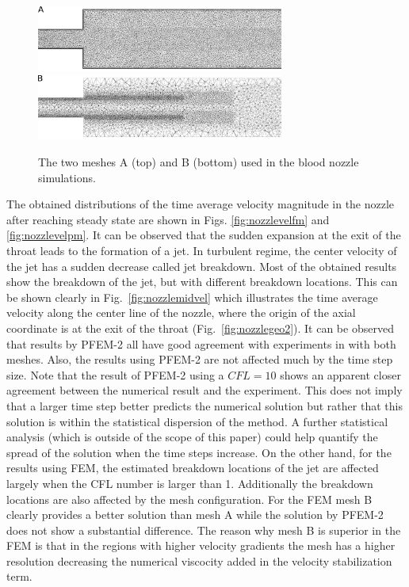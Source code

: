 \begin{figure}[htbp]
    \centering
    \includegraphics[width=3.2in]{imgs/nozzle_pump/nozzle_fmesh_2.pdf}
    \includegraphics[width=3.2in]{imgs/nozzle_pump/nozzle_pmesh_2.pdf}
    \caption{The two meshes A (top) and B (bottom) used in the blood nozzle simulations.}
    \label{fig:nozzlemesh}
\end{figure}


The obtained distributions of the time average velocity magnitude in the nozzle after reaching steady state are shown in Figs. \ref{fig:nozzlevelfm} and \ref{fig:nozzlevelpm}. It can be observed that the sudden expansion at the exit of the throat leads to the formation of a jet. In turbulent regime, the center velocity of the jet has a sudden decrease called jet breakdown. Most of the obtained results show the breakdown of the jet, but with different breakdown locations. This can be shown clearly in Fig.~\ref{fig:nozzlemidvel} which illustrates the time average velocity along the center line of the nozzle, where the origin of the axial coordinate is at the exit of the throat (Fig.~\ref{fig:nozzlegeo2}). It can be observed that results by PFEM-2 all have good agreement with experiments in \cite{hariharan_nozzle} with both meshes. Also, the results using PFEM-2 are not affected much by the time step size. Note that the result of PFEM-2 using a $CFL=10$ shows an apparent closer agreement between the numerical result and the experiment. This does not imply that a larger time step better predicts the numerical solution but rather that this solution is within the statistical dispersion of the method. A further statistical analysis (which is outside of the scope of this paper) could help quantify the spread of the solution when the time steps increase. On the other hand, for the results using FEM, the estimated breakdown locations of the jet are affected largely when the CFL number is larger than 1. Additionally the breakdown locations are also affected by the mesh configuration. For the FEM mesh B clearly provides a better solution than mesh A while the solution by PFEM-2 does not show a substantial difference. The reason why mesh B is superior in the FEM is that in the regions with higher velocity gradients the mesh has a higher resolution decreasing the numerical viscocity added in the velocity stabilization term. 

